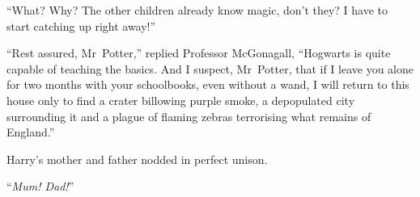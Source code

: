 “What? Why? The other children already know magic, don’t they? I have to start catching up right away!”

“Rest assured, Mr~Potter,” replied Professor McGonagall, “Hogwarts is quite capable of teaching the basics. And I suspect, Mr~Potter, that if I leave you alone for two months with your schoolbooks, even without a wand, I will return to this house only to find a crater billowing purple smoke, a depopulated city surrounding it and a plague of flaming zebras terrorising what remains of England.”

Harry’s mother and father nodded in perfect unison.

“\emph{Mum! Dad!}”

